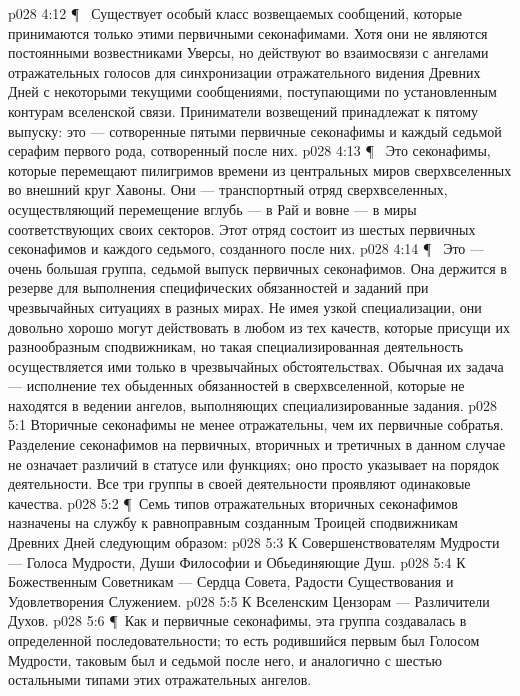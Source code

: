 \vs p028 4:12 \P\ \bibnobreakspace {} Существует особый класс возвещаемых сообщений, которые принимаются только этими первичными секонафимами. Хотя они не являются постоянными возвестниками Уверсы, но действуют во взаимосвязи с ангелами отражательных голосов для синхронизации отражательного видения Древних Дней с некоторыми текущими сообщениями, поступающими по установленным контурам вселенской связи. Приниматели возвещений принадлежат к пятому выпуску: это --- сотворенные пятыми первичные секонафимы и каждый седьмой серафим первого рода, сотворенный после них.
\vs p028 4:13 \P\ \bibnobreakspace {} Это секонафимы, которые перемещают пилигримов времени из центральных миров сверхвселенных во внешний круг Хавоны. Они --- транспортный отряд сверхвселенных, осуществляющий перемещение вглубь --- в Рай и вовне --- в миры соответствующих своих секторов. Этот отряд состоит из шестых первичных секонафимов и каждого седьмого, созданного после них.
\vs p028 4:14 \P\ \bibnobreakspace {} Это --- очень большая группа, седьмой выпуск первичных секонафимов. Она держится в резерве для выполнения специфических обязанностей и заданий при чрезвычайных ситуациях в разных мирах. Не имея узкой специализации, они довольно хорошо могут действовать в любом из тех качеств, которые присущи их разнообразным сподвижникам, но такая специализированная деятельность осуществляется ими только в чрезвычайных обстоятельствах. Обычная их задача --- исполнение тех обыденных обязанностей в сверхвселенной, которые не находятся в ведении ангелов, выполняющих специализированные задания.
\vs p028 5:1 Вторичные секонафимы не менее отражательны, чем их первичные собратья. Разделение секонафимов на первичных, вторичных и третичных в данном случае не означает различий в статусе или функциях; оно просто указывает на порядок деятельности. Все три группы в своей деятельности проявляют одинаковые качества.
\vs p028 5:2 \P\ Семь типов отражательных вторичных секонафимов назначены на службу к равноправным созданным Троицей сподвижникам Древних Дней следующим образом:
\vs p028 5:3 К Совершенствователям Мудрости --- Голоса Мудрости, Души Философии и Обьединяющие Душ.
\vs p028 5:4 К Божественным Советникам --- Сердца Совета, Радости Существования и Удовлетворения Служением.
\vs p028 5:5 К Вселенским Цензорам --- Различители Духов.
\vs p028 5:6 \P\ Как и первичные секонафимы, эта группа создавалась в определенной последовательности; то есть родившийся первым был Голосом Мудрости, таковым был и седьмой после него, и аналогично с шестью остальными типами этих отражательных ангелов.
